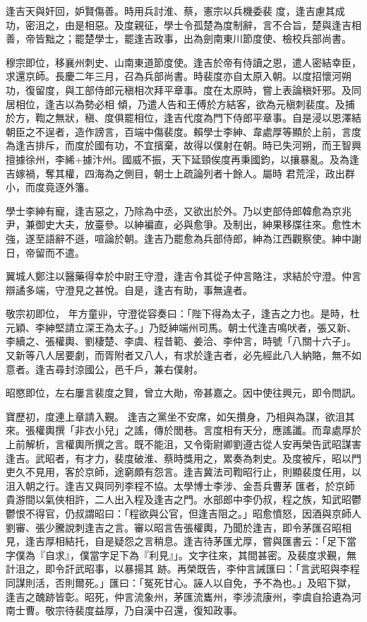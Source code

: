 \begin{pinyinscope}
 逢吉天與奸回，妒賢傷善。時用兵討淮、蔡，憲宗以兵機委裴
 度，逢吉慮其成功，密沮之，由是相惡。及度親征，學士令孤楚為度制辭，言不合旨，楚與逢吉相善，帝皆黜之；罷楚學士，罷逢吉政事，出為劍南東川節度使、檢校兵部尚書。



 穆宗即位，移襄州刺史、山南東道節度使。逢吉於帝有侍讀之恩，遣人密結幸臣，求還京師。長慶二年三月，召為兵部尚書。時裴度亦自太原入朝。以度招懷河朔功，復留度，與工部侍郎元稹相次拜平章事。度在太原時，嘗上表論稹奸邪。及同居相位，逢吉以為勢必相
 傾，乃遣人告和王傅於方結客，欲為元稹刺裴度。及捕於方，鞫之無狀，稹、度俱罷相位，逢吉代度為門下侍郎平章事。自是浸以恩澤結朝臣之不逞者，造作謗言，百端中傷裴度。賴學士李紳、韋處厚等顯於上前，言度為逢吉排斥，而度於國有功，不宜擯棄，故得以僕射在朝。時已失河朔，而王智興擅據徐州，李絺+據汴州。國威不振，天下延頸俟度再秉國鈞，以攘暴亂。及為逢吉嫁禍，奪其權，四海為之側目，朝士上疏論列者十餘人。屬時
 君荒淫，政出群小，而度竟逐外籓。



 學士李紳有寵，逢吉惡之，乃除為中丞，又欲出於外。乃以吏部侍郎韓愈為京兆尹，兼御史大夫，放臺參。以紳褊直，必與愈爭。及制出，紳果移牒往來。愈性木強，遂至語辭不遜，喧論於朝。逢吉乃罷愈為兵部侍郎，紳為江西觀察使。紳中謝日，帝留而不遣。



 翼城人鄭注以醫藥得幸於中尉王守澄，逢吉令其從子仲言賂注，求結於守澄。仲言辯譎多端，守澄見之甚悅。自是，逢吉有助，事無違者。



 敬宗初即位，
 年方童丱，守澄從容奏曰：「陛下得為太子，逢吉之力也。是時，杜元穎、李紳堅請立深王為太子。」乃貶紳端州司馬。朝士代逢吉鳴吠者，張又新、李續之、張權輿、劉棲楚、李虞、程昔範、姜洽、李仲言，時號「八關十六子」。又新等八人居要劇，而胥附者又八人，有求於逢吉者，必先經此八人納賂，無不如意者。逢吉尋封涼國公，邑千戶，兼右僕射。



 昭愍即位，左右屢言裴度之賢，曾立大勛，帝甚嘉之。因中使往興元，即令問訊。



 寶歷初，度連上章請入覲。
 逢吉之黨坐不安席，如矢攢身，乃相與為謀，欲沮其來。張權輿撰「非衣小兒」之謠，傳於閭巷。言度相有天分，應謠讖。而韋處厚於上前解析，言權輿所撰之言。既不能沮，又令衛尉卿劉遵古從人安再榮告武昭謀害逢吉。武昭者，有才力，裴度破淮、蔡時獎用之，累奏為刺史。及度被斥，昭以門吏久不見用，客於京師，途窮頗有怨言。逢吉冀法司鞫昭行止，則顯裴度任用，以沮入朝之行。逢吉又與同列李程不協。太學博士李涉、金吾兵曹茅
 匯者，於京師貴游間以氣俠相許，二人出入程及逢吉之門。水部郎中李仍叔，程之族，知武昭鬱鬱恨不得官，仍叔謂昭曰：「程欲與公官，但逢吉阻之。」昭愈憤怒，因酒與京師人劉審、張少騰說刺逢吉之言。審以昭言告張權輿，乃聞於逢吉，即令茅匯召昭相見，逢吉厚相結托，自是疑怨之言稍息。逢吉待茅匯尤厚，嘗與匯書云：「足下當字僕為『自求』，僕當字足下為『利見』」。文字往來，其間甚密。及裴度求覲，無計沮之，即令訐武昭事，以暴揚其
 跡。再榮既告，李仲言誡匯曰：「言武昭與李程同謀則活，否則爾死。」匯曰：「冤死甘心。誣人以自免，予不為也。」及昭下獄，逢吉之醜跡皆彰。昭死，仲言流象州，茅匯流巂州，李涉流康州，李虞自拾遺為河南士曹。敬宗待裴度益厚，乃自漢中召還，復知政事。




\end{pinyinscope}
